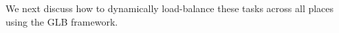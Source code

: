 We next discuss how to dynamically load-balance these
tasks across all places using the GLB framework. 








